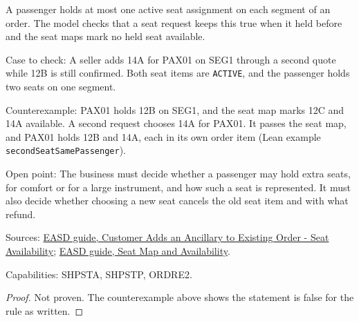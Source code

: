 \begin{theorem}
  \label{thm:ancillaries-seat-one-per-passenger}
  A passenger holds at most one active seat assignment on each segment of an
  order.
  The model checks that a seat request keeps this true when it held before
  and the seat maps mark no held seat available.

  Case to check: A seller adds 14A for PAX01 on SEG1 through a second quote
  while 12B is still confirmed. Both seat items are \texttt{ACTIVE}, and the
  passenger holds two seats on one segment.

  Counterexample: PAX01 holds 12B on SEG1, and the seat map marks 12C and
  14A available.  A second request chooses 14A for PAX01.  It passes the
  seat map, and PAX01 holds 12B and 14A, each in its own order item (Lean
  example \texttt{secondSeatSamePassenger}).

  Open point: The business must decide whether a passenger may hold extra
  seats, for comfort or for a large instrument, and how such a seat is
  represented. It must also decide whether choosing a new seat cancels the
  old seat item and with what refund.

  Sources: \href{https://standards.atlassian.net/wiki/spaces/EASD/pages/842268814}{EASD guide, Customer Adds an Ancillary to Existing Order - Seat Availability};
  \href{https://standards.atlassian.net/wiki/spaces/EASD/pages/574586953}{EASD guide, Seat Map and Availability}.

  Capabilities: SHPSTA, SHPSTP, ORDRE2.
\end{theorem}
\begin{proof}
  Not proven.  The counterexample above shows the statement is false for the
  rule as written.
\end{proof}

